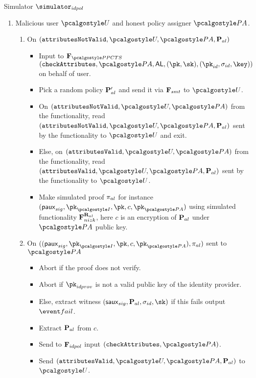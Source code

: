 \documentclass[runningheads,10pt]{llncs}
\numberwithin{equation}{section}
\begin{document}
\begin{simbox}{Simulator $\simulator_{idpol}$}
\begin{enumerate}
    \item Malicious user $\user$ and honest policy assigner $\polas$.
      \begin{enumerate}
      \item On $(\attributesNotValid, \user, \polas, \alpolicy)$
        \begin{itemize}
        \item Input to $\func{\PPCTS}$
          $(\checkAttributes, \polas, \AL, (\pk, \sk), (\pk_{id},
          \signature_{id}, \key))$ on behalf of user.
        \item Pick a random policy $\mathbf{P}_{al}'$ and send it via $\mathbf{F}_{{smt}}$ to
          $\user$.
        \item On $(\attributesNotValid, \user, \polas)$ from the functionality, read
          $(\attributesNotValid, \user, \polas, \alpolicy)$ sent by the functionality
          to $\user$ and exit.
        \item Else, on $(\attributesValid,  \user, \polas)$ from the
          functionality, read $(\attributesValid, \user, \polas, \alpolicy)$
          sent by the functionality to $\user$. 
        \item Make simulated proof $\mathsf{\pi}_{al}$ for instance
          $(\paux_{sig}, \pk_{\idprov}, \pk, c, \pk_{\polas})$ using simulated
          functionality $\mathbf{F}_{{nizk}}^{\mathbf{R}_{al}}$, here $c$ is an encryption of
          $\mathbf{P}_{al}$ under $\polas$ public key.
        \end{itemize}
      \item On $((\paux_{sig}, \pk_{\idprov}, \pk, c, \pk_{\polas}), \zkproof_{al})$ sent to
        $\polas$
        \begin{itemize}
        \item Abort if the proof does not verify.
        \item Abort if $\pk_{idprov}$ is not a valid public key of the identity provider.
        \item Else, extract witness $(\saux_{sig}, \alpolicy, \signature_{id}, \sk)$ if
          this fails output $\fail$.
        \item Extract $\mathbf{P}_{al}$ from $c$.
        \item Send to $\mathbf{F}_{{idpol}}$ input $(\checkAttributes, \polas)$.
        \item Send $(\attributesValid, \user, \polas, \alpolicy)$ to $\user$.
        \end{itemize}
      \end{enumerate}


\end{enumerate}
\end{simbox}
\end{document}
